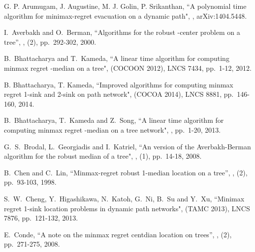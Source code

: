 \documentclass[a4paper]{llncs}
\begin{document}
\begin{thebibliography}{99}

		G. P. Arumugam, J. Augustine, M. J. Golin, P. Srikanthan,
		\newblock ``A polynomial time algorithm for minimax-regret evacuation on a dynamic path",
		,
		\newblock arXiv:1404.5448.

		I.~Averbakh and O.~Berman, 
		\newblock ``Algorithms for the robust -center problem on a tree'', 
		,
		(2), pp.~292-302, 2000.
	
		B.~Bhattacharya and T.~Kameda,
		\newblock ``A linear time algorithm for computing minmax regret -median on a tree",
		 (COCOON 2012),
		\newblock LNCS 7434, pp.~1-12, 2012. 
		
		B. Bhattacharya, T. Kameda,
		\newblock ``Improved algorithms for computing minmax regret 1-sink and 2-sink on path network",
		 (COCOA 2014),
		\newblock LNCS 8881, pp.~146-160, 2014.
	
		B.~Bhattacharya, T.~Kameda and Z.~Song,
		\newblock ``A linear time algorithm for computing minmax regret -median on a tree network",
		,
		\newblock pp.~1-20, 2013. 

		G.~S.~Brodal, L.~Georgiadis and I.~Katriel,
		\newblock ``An  version of the Averbakh-Berman algorithm for the robust median of a tree",
		,
		(1), pp.~14-18, 2008. 

		B.~Chen and C.~Lin, 
		\newblock ``Minmax-regret robust 1-median location on a tree'', 
		,
		(2), pp.~93-103, 1998.



		S.~W.~Cheng, Y.~Higashikawa, N.~Katoh, G.~Ni, B.~Su and Y.~Xu,
		\newblock ``Minimax regret 1-sink location problems in dynamic path networks",
		 (TAMC 2013),
		\newblock LNCS 7876, pp.~121-132, 2013.



		E.~Conde, 
		\newblock ``A note on the minmax regret centdian location on trees'',
		,
		(2), pp.~271-275, 2008.


\end{thebibliography}
\end{document}
